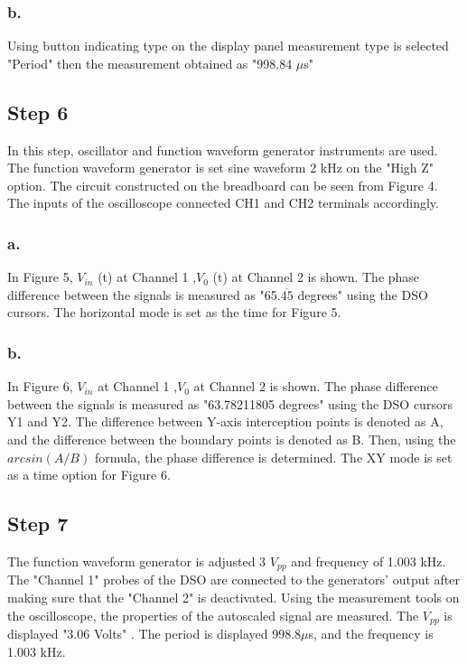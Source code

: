 \documentclass[letterpaper,12pt]{article}
\begin{document}
\subsubsection{b.}
Using button indicating type on the display panel measurement type is selected "Period" then the measurement obtained as "998.84 \(\mu\)s"
\subsection{Step 6}
In this step, oscillator and function waveform generator instruments are used. The function waveform generator is set sine waveform 2 kHz on the "High Z" option. The circuit constructed on the breadboard can be seen from Figure 4. The inputs of the oscilloscope connected CH1 and CH2 terminals accordingly.


\subsubsection{a.}
In Figure 5, \( V_{in}\) (t) at Channel 1 ,\( V_0 \) (t) at Channel 2 is shown. The phase difference between the signals is measured as "65.\(\overline{45}\)  degrees" using the DSO cursors. The horizontal mode is set as the time for Figure 5.


\subsubsection{b.}
In Figure 6, \( V_{in}\) at Channel 1 ,\( V_0 \) at Channel 2 is shown. The phase difference between the signals is measured as "63.78211805 degrees" using the DSO cursors Y1 and Y2. The difference between Y-axis interception points is denoted as A, and the difference between the boundary points is denoted as B. Then, using the \(arcsin({A}/{B})\) formula, the phase difference is determined. The XY mode is set as a time option for Figure 6.


\subsection{Step 7}
The function waveform generator is adjusted 3 \(V_{pp}\) and frequency of 1.003 kHz. The "Channel 1" probes of the DSO are connected to the generators' output after making sure that the "Channel 2" is deactivated. Using the measurement tools on the oscilloscope, the properties of the autoscaled signal are measured. The  \(V_{pp}\) is displayed "3.06 Volts" . The period is displayed 998.8\( \mu \)s, and the frequency is 1.003 kHz.
\end{document}
